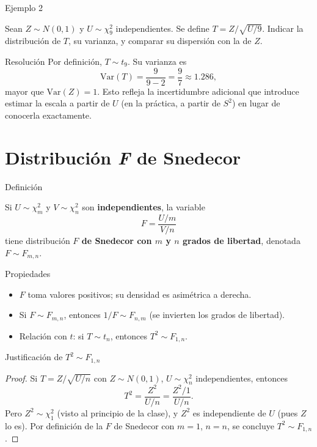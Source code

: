 \documentclass[aspectratio=169,11pt]{beamer}
\begin{document}
\begin{frame}{Ejemplo 2}
\begin{example}
Sean $Z\sim N(0,1)$ y $U\sim\chi_9^2$ independientes. Se define $T=Z/\sqrt{U/9}$. Indicar la distribución de $T$, su varianza, y comparar su dispersión con la de $Z$.
\end{example}
\pause
\begin{block}{Resolución}
Por definición, $T\sim t_9$. Su varianza es
\[
\text{Var}(T) = \frac{9}{9-2} = \frac{9}{7} \approx 1.286,
\]
mayor que $\text{Var}(Z)=1$. Esto refleja la incertidumbre adicional que introduce estimar la escala a partir de $U$ (en la práctica, a partir de $S^2$) en lugar de conocerla exactamente.
\end{block}
\end{frame}

\section{Distribución \emph{F} de Snedecor}

\begin{frame}{Definición}
\begin{definition}[$F$ de Snedecor]
Si $U\sim\chi^2_m$ y $V\sim\chi^2_n$ son \textbf{independientes}, la variable
\[
F = \frac{U/m}{V/n}
\]
tiene distribución \textbf{$F$ de Snedecor con $m$ y $n$ grados de libertad}, denotada $F\sim F_{m,n}$.
\end{definition}
\begin{block}{Propiedades}
\begin{itemize}
\item $F$ toma valores positivos; su densidad es asimétrica a derecha.
\item Si $F\sim F_{m,n}$, entonces $1/F \sim F_{n,m}$ (se invierten los grados de libertad).
\item Relación con $t$: si $T\sim t_n$, entonces $T^2 \sim F_{1,n}$.
\end{itemize}
\end{block}
\end{frame}

\begin{frame}{Justificación de $T^2\sim F_{1,n}$}
\begin{proof}
Si $T = Z/\sqrt{U/n}$ con $Z\sim N(0,1)$, $U\sim\chi_n^2$ independientes, entonces
\[
T^2 = \frac{Z^2}{U/n} = \frac{Z^2/1}{U/n}.
\]
Pero $Z^2 \sim \chi_1^2$ (visto al principio de la clase), y $Z^2$ es independiente de $U$ (pues $Z$ lo es). Por definición de la $F$ de Snedecor con $m=1$, $n=n$, se concluye $T^2\sim F_{1,n}$. \qedhere
\end{proof}
\end{frame}
\end{document}
